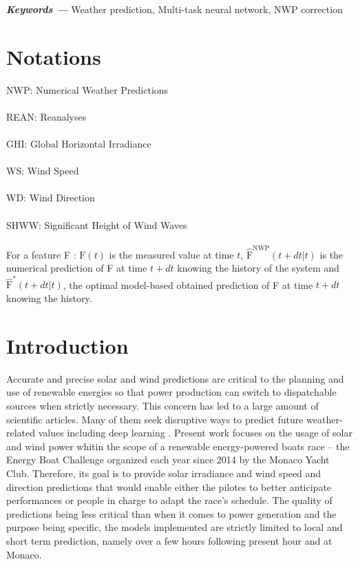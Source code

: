 \documentclass{article}
\providecommand{\keywords}[1]{\textbf{\textit{Keywords ---}} #1}
\begin{document}
\vspace{20px}

\keywords{Weather prediction, Multi-task neural network, NWP correction}

\section*{Notations}

NWP: Numerical Weather Predictions\\
\\
REAN: Reanalyses\\
\\
GHI: Global Horizontal Irradiance\\
\\
WS: Wind Speed\\
\\
WD: Wind Direction\\
\\
SHWW: Significant Height of Wind Waves\\
\\
For a feature F : $\mathrm F (t)$ is the measured value at time $t$, $\hat{\mathrm F}^\mathrm{NWP} (t + dt | t)$ is
the numerical prediction of F at time $t + dt$ knowing the history of the system
and $\hat{\mathrm F}^* (t + dt | t)$, the optimal model-based obtained prediction of F at time $t + dt$ knowing the history.

\section{Introduction}

Accurate and precise solar and wind predictions are critical to the planning and use of renewable energies so that
power production can switch to dispatchable sources when strictly necessary. This concern has led to a large amount of
scientific articles. Many of them seek disruptive ways to predict future weather-related values including deep learning
\cite{zhong_multi-view_2021}.
Present work focuses on the usage of solar and wind power whitin the scope of a renewable energy-powered boats race
-- the Energy Boat Challenge organized each year since 2014 by the Monaco Yacht Club. Therefore, its goal is to provide
solar irradiance and wind speed and direction predictions that would enable either the pilotes to better anticipate
performances or people in charge to adapt the race's schedule. The quality of predictions being less critical than
when it comes to power generation and the purpose being specific, the models implemented are strictly limited to
local and short term prediction, namely over a few hours following present hour and at Monaco.
\end{document}
